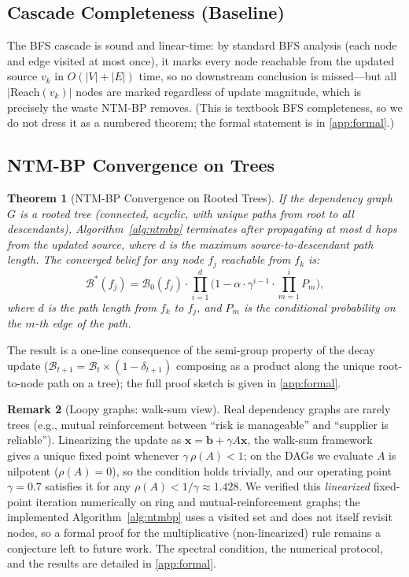 \documentclass{article}
\newtheorem{theorem}{Theorem}[section]
\theoremstyle{definition}
\newtheorem{remark}[theorem]{Remark}
\begin{document}
\subsection{Cascade Completeness (Baseline)}

The BFS cascade is sound and linear-time: by standard BFS analysis
(each node and edge visited at most once), it marks every node
reachable from the updated source $v_k$ in $O(|V|+|E|)$ time, so no
downstream conclusion is missed---but all $|\text{Reach}(v_k)|$ nodes
are marked regardless of update magnitude, which is precisely the waste
NTM-BP removes.  (This is textbook BFS completeness, so we do not dress
it as a numbered theorem; the formal statement is in \cref{app:formal}.)

\subsection{NTM-BP Convergence on Trees}

\begin{theorem}[NTM-BP Convergence on Rooted Trees]
\label{thm:convergence}
If the dependency graph $G$ is a rooted tree (connected, acyclic, with
unique paths from root to all descendants), Algorithm~\ref{alg:ntmbp}
terminates after propagating at most $d$ hops from the updated source,
where $d$ is the maximum source-to-descendant path length.  The
converged belief for any node $f_j$ reachable from $f_k$ is:
\begin{equation}
  \mathcal{B}^*(f_j) = \mathcal{B}_0(f_j) \cdot
  \prod_{i=1}^{d}\Big(1 - \alpha\cdot\gamma^{i-1}\cdot
  \prod_{m=1}^{i}P_m\Big),
  \label{eq:converged}
\end{equation}
where $d$ is the path length from $f_k$ to $f_j$, and $P_m$ is the
conditional probability on the $m$-th edge of the path.
\end{theorem}

The result is a one-line consequence of the semi-group property of the
decay update ($\mathcal{B}_{t+1}=\mathcal{B}_t\times(1-\delta_{t+1})$
composing as a product along the unique root-to-node path on a tree);
the full proof sketch is given in \cref{app:formal}.

\begin{remark}[Loopy graphs: walk-sum view]
\label{rem:loopy}
Real dependency graphs are rarely trees (e.g., mutual reinforcement
between ``risk is manageable'' and ``supplier is reliable'').
Linearizing the update as $\mathbf{x}=\mathbf{b}+\gamma A\mathbf{x}$, the
walk-sum framework~\cite{malioutov2006walksum} gives a unique fixed
point whenever $\gamma\,\rho(A)<1$; on the DAGs we evaluate $A$ is
nilpotent ($\rho(A)=0$), so the condition holds trivially, and our
operating point $\gamma=0.7$ satisfies it for any
$\rho(A)<1/\gamma\approx1.428$.  We
verified this \emph{linearized} fixed-point iteration numerically on ring
and mutual-reinforcement graphs; the implemented Algorithm~\ref{alg:ntmbp}
uses a visited set and does not itself revisit nodes, so a formal proof
for the multiplicative (non-linearized) rule remains a conjecture left
to future work.  The spectral condition, the numerical protocol, and
the results are detailed in \cref{app:formal}.
\end{remark}
\end{document}
